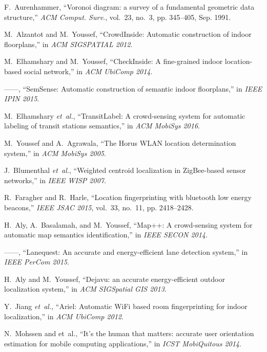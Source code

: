 \documentclass[conference]{IEEEtran}
\begin{document}
\begin{thebibliography}{10}
F.~Aurenhammer, ``Voronoi diagram: a survey of a fundamental geometric data
  structure,'' \emph{ACM Comput. Surv.}, vol.~23, no.~3, pp. 345--405, Sep.
  1991.

M.~Alzantot and M.~Youssef, ``{CrowdInside}: Automatic construction of indoor
  floorplans,'' in \emph{ACM SIGSPATIAL 2012}.

M.~Elhamshary and M.~Youssef, ``{CheckInside}: A fine-grained indoor
  location-based social network,'' in \emph{ACM UbiComp 2014}.

------, ``{SemSense}: Automatic construction of semantic indoor floorplans,''
  in \emph{IEEE IPIN 2015}.

M.~Elhamshary \emph{et~al.}, ``{TransitLabel}: A crowd-sensing system for
  automatic labeling of transit stations semantics,'' in \emph{ACM MobiSys
  2016}.

M.~Youssef and A.~Agrawala, ``The {H}orus {WLAN} location determination
  system,'' in \emph{ACM MobiSys 2005}.

J.~Blumenthal \emph{et~al.}, ``Weighted centroid localization in {ZigBee}-based
  sensor networks,'' in \emph{IEEE WISP 2007}.

R.~Faragher and R.~Harle, ``Location fingerprinting with bluetooth low energy
  beacons,'' \emph{IEEE JSAC 2015}, vol.~33, no.~11, pp. 2418--2428.

H.~Aly, A.~Basalamah, and M.~Youssef, ``Map++: A crowd-sensing system for
  automatic map semantics identification,'' in \emph{IEEE SECON 2014}.

------, ``Lanequest: An accurate and energy-efficient lane detection system,''
  in \emph{IEEE PerCom 2015}.

H.~Aly and M.~Youssef, ``Dejavu: an accurate energy-efficient outdoor
  localization system,'' in \emph{ACM SIGSpatial GIS 2013}.

Y.~Jiang \emph{et~al.}, ``Ariel: Automatic {WiFi} based room fingerprinting for
  indoor localization,'' in \emph{ACM UbiComp 2012}.

N.~Mohssen and et~al., ``It's the human that matters: accurate user orientation
  estimation for mobile computing applications,'' in \emph{ICST MobiQuitous
  2014}.


\end{thebibliography}
\end{document}
